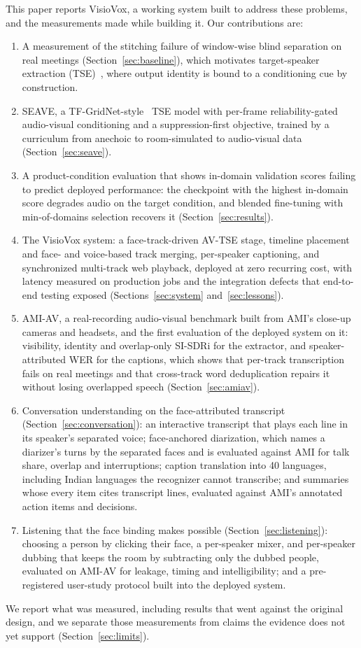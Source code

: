 \documentclass[conference]{IEEEtran}
\begin{document}
This paper reports VisioVox, a working system built to address these problems, and the measurements made while building it. Our contributions are:
\begin{enumerate}
\item A measurement of the stitching failure of window-wise blind separation on real meetings (Section~\ref{sec:baseline}), which motivates target-speaker extraction (TSE)~\cite{zmolikova2023overview}, where output identity is bound to a conditioning cue by construction.
\item SEAVE, a TF-GridNet-style~\cite{wang2023tfgridnet} TSE model with per-frame reliability-gated audio-visual conditioning and a suppression-first objective, trained by a curriculum from anechoic to room-simulated to audio-visual data (Section~\ref{sec:seave}).
\item A product-condition evaluation that shows in-domain validation scores failing to predict deployed performance: the checkpoint with the highest in-domain score degrades audio on the target condition, and blended fine-tuning with min-of-domains selection recovers it (Section~\ref{sec:results}).
\item The VisioVox system: a face-track-driven AV-TSE stage, timeline placement and face- and voice-based track merging, per-speaker captioning, and synchronized multi-track web playback, deployed at zero recurring cost, with latency measured on production jobs and the integration defects that end-to-end testing exposed (Sections~\ref{sec:system} and~\ref{sec:lessons}).
\item AMI-AV, a real-recording audio-visual benchmark built from AMI's close-up cameras and headsets, and the first evaluation of the deployed system on it: visibility, identity and overlap-only SI-SDRi for the extractor, and speaker-attributed WER for the captions, which shows that per-track transcription fails on real meetings and that cross-track word deduplication repairs it without losing overlapped speech (Section~\ref{sec:amiav}).
\item Conversation understanding on the face-attributed transcript (Section~\ref{sec:conversation}): an interactive transcript that plays each line in its speaker's separated voice; face-anchored diarization, which names a diarizer's turns by the separated faces and is evaluated against AMI for talk share, overlap and interruptions; caption translation into 40 languages, including Indian languages the recognizer cannot transcribe; and summaries whose every item cites transcript lines, evaluated against AMI's annotated action items and decisions.
\item Listening that the face binding makes possible (Section~\ref{sec:listening}): choosing a person by clicking their face, a per-speaker mixer, and per-speaker dubbing that keeps the room by subtracting only the dubbed people, evaluated on AMI-AV for leakage, timing and intelligibility; and a pre-registered user-study protocol built into the deployed system.
\end{enumerate}
We report what was measured, including results that went against the original design, and we separate those measurements from claims the evidence does not yet support (Section~\ref{sec:limits}).
\end{document}
